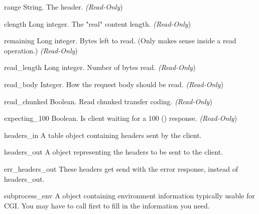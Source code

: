 \begin{memberdesc}[request]{range}
String. The  header.
\emph{(Read-Only})
\end{memberdesc}

\begin{memberdesc}[request]{clength}
Long integer. The "real" content length.
\emph{(Read-Only})
\end{memberdesc}

\begin{memberdesc}[request]{remaining}
Long integer. Bytes left to read. (Only makes sense inside a read
operation.)
\emph{(Read-Only})
\end{memberdesc}

\begin{memberdesc}[request]{read_length}
Long integer. Number of bytes read.
\emph{(Read-Only})
\end{memberdesc}

\begin{memberdesc}[request]{read_body}
Integer. How the request body should be read.
\emph{(Read-Only})
\end{memberdesc}

\begin{memberdesc}[request]{read_chunked}
Boolean. Read chunked transfer coding.
\emph{(Read-Only})
\end{memberdesc}

\begin{memberdesc}[request]{expecting_100}
Boolean. Is client waiting for a 100 () response.
\emph{(Read-Only})
\end{memberdesc}

\begin{memberdesc}[request]{headers_in}
A table object containing headers sent by the client.
\end{memberdesc}

\begin{memberdesc}[request]{headers_out}
A  object representing the headers to be sent to the
client. 
\end{memberdesc}

\begin{memberdesc}[request]{err_headers_out}
These headers get send with the error response, instead of
headers_out.
\end{memberdesc}

\begin{memberdesc}[request]{subprocess_env}
A  object containing environment information typically usable for CGI.
You may have to call  first to fill in the information
you need.
\end{memberdesc}


